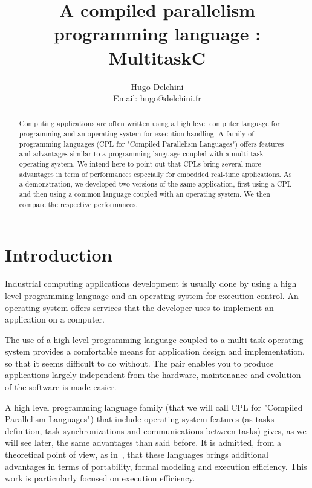 \documentclass[10pt]{report}
\begin{document}
\title{A compiled parallelism programming language : MultitaskC}

\author{
Hugo Delchini\\
Email: hugo@delchini.fr\\
}

\maketitle
\thispagestyle{empty}

\begin{abstract}

Computing applications are often written using a high level computer language for programming and an
operating system for execution handling. A family of programming languages (CPL for "Compiled Parallelism
Languages") offers features and advantages similar to a programming language coupled with a multi-task
operating system. We intend here to point out that CPLs bring several more advantages in term of performances
especially for embedded real-time applications. As a demonstration, we developed two versions of the same application,
first using a CPL and then using a common language coupled with an operating system. We then compare the respective performances.

\end{abstract}

\chapter{Introduction}
\label{sec:intro}

Industrial computing applications development is usually done by using a high level programming language
and an operating system for execution control. An operating system offers services that the developer
uses to implement an application on a computer.

The use of a high level programming language coupled to a multi-task operating system provides a comfortable
means for application design and implementation, so that it seems difficult to do without. The pair enables you
to produce applications largely independent from the hardware, maintenance and evolution of the software is made easier.

A high level programming language family (that we will call CPL for "Compiled Parallelism Languages")
that include operating system features (as tasks definition, task synchronizations and communications
between tasks) gives, as we will see later, the same advantages than said before. It is admitted, from a
theoretical point of view, as in~\cite{Halbwachs:91}, that these languages brings additional advantages
in terms of portability, formal modeling and execution efficiency. This work is particularly focused on
execution efficiency.
\end{document}
